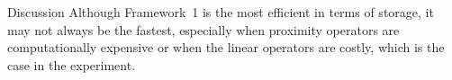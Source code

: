 \documentclass[%
compress]{beamer}
\newcommand{\tdred}[1]{{\color{dred}#1}}
\newcommand{\tdgreen}[1]{{\color{dgreen}#1}}
\begin{document}
\begin{frame}{Discussion}
\justifying
Although Framework~1 is the most efficient in terms of storage, it
may not always be the fastest, especially when \tdgreen{proximity} 
operators are computationally expensive or when the \tdred{linear} 
operators are costly, which is the case in the experiment.
\end{frame}

\begin{frame}
\titlepage
{}
\end{frame}
\end{document}
